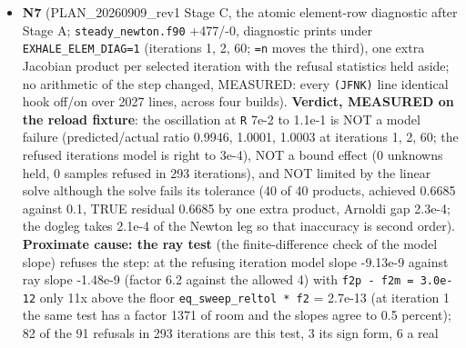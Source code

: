 \documentclass[english,a4paper]{my_memo}
\begin{document}
\begin{itemize}
  gfortran 13, against the standing toolchain rule, so the advisor\textquotesingle s run on
  the standard toolchain is the one on record). \textbf{Reported, not fixed}:
  the window integrals of the assembled residual are not Lipschitz in the
  state in the odd-even band above the base (one round trip at 4.9e-16
  moves the 1.03-1.10 mass window by 16 percent and flips cell residual
  signs at cells 183-187; one ulp on every species column reproduces it),
  so a round-trip residual budget must be stated on the row maxima (N5);
  \texttt{restart\_grid\_guard.sh} carries a stale header describing a fixed defect;
  nothing checks the writer\textquotesingle s \texttt{rho} column against its species (decision
  15\textquotesingle s contract); \texttt{EXHALE\_RESIDUAL=1} runs one sweep unconditionally, so a
  true "no chemistry on load" evaluation has no entry point yet (N10).
\item
  \textbf{N7} (PLAN\_20260909\_rev1 Stage C, the atomic element-row diagnostic
  after Stage A; \texttt{steady\_newton.f90} +477/-0, diagnostic prints under
  \texttt{EXHALE\_ELEM\_DIAG=1} (iterations 1, 2, 60; \texttt{=n} moves the third), one
  extra Jacobian product per selected iteration with the refusal
  statistics held aside; no arithmetic of the step changed, MEASURED: every
  \texttt{(JFNK)} line identical hook off/on over 2027 lines, across four builds).
  \textbf{Verdict, MEASURED on the reload fixture}: the oscillation at \texttt{\textbar{}\textbar{}R\textbar{}\textbar{}}
  7e-2 to 1.1e-1 is NOT a model failure (predicted/actual ratio 0.9946,
  1.0001, 1.0003 at iterations 1, 2, 60; the refused iteration\textquotesingle s model is
  right to 3e-4), NOT a bound effect (0 unknowns held, 0 samples refused
  in 293 iterations), and NOT limited by the linear solve although the
  solve fails its tolerance (40 of 40 products, achieved 0.6685 against
  0.1, TRUE residual 0.6685 by one extra product, Arnoldi gap 2.3e-4; the
  dogleg takes 2.1e-4 of the Newton leg so that inaccuracy is second
  order). \textbf{Proximate cause: the ray test} (the finite-difference check of
  the model slope) refuses the step: at the refusing iteration model slope
  -9.13e-9 against ray slope -1.48e-9 (factor 6.2 against the allowed 4)
  with \texttt{\textbar{}f2p\ -\ f2m\textbar{}\ =\ 3.0e-12} only 11x above the floor
  \texttt{eq\_sweep\_reltol\ *\ \textbar{}f2\textbar{}} = 2.7e-13 (at iteration 1 the same test has a
  factor 1371 of room and the slopes agree to 0.5 percent); 82 of the 91
  refusals in 293 iterations are this test, 3 its sign form, 6 a real

\end{itemize}
\end{document}
